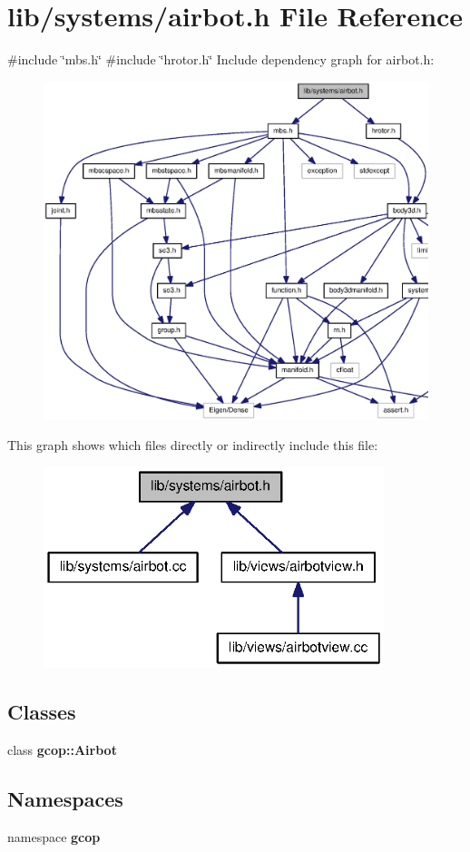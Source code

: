 \section{lib/systems/airbot.h \-File \-Reference}
\label{airbot_8h}
{\ttfamily \#include \char`\"{}mbs.\-h\char`\"{}}\*
{\ttfamily \#include \char`\"{}hrotor.\-h\char`\"{}}\*
\-Include dependency graph for airbot.\-h\-:\nopagebreak
\begin{figure}[H]
\begin{center}
\leavevmode
\includegraphics[width=350pt]{airbot_8h__incl}
\end{center}
\end{figure}
\-This graph shows which files directly or indirectly include this file\-:\nopagebreak
\begin{figure}[H]
\begin{center}
\leavevmode
\includegraphics[width=281pt]{airbot_8h__dep__incl}
\end{center}
\end{figure}
\subsection*{\-Classes}
\begin{DoxyCompactItemize}
\item 
class {\bf gcop\-::\-Airbot}
\end{DoxyCompactItemize}
\subsection*{\-Namespaces}
\begin{DoxyCompactItemize}
\item 
namespace {\bf gcop}
\end{DoxyCompactItemize}
